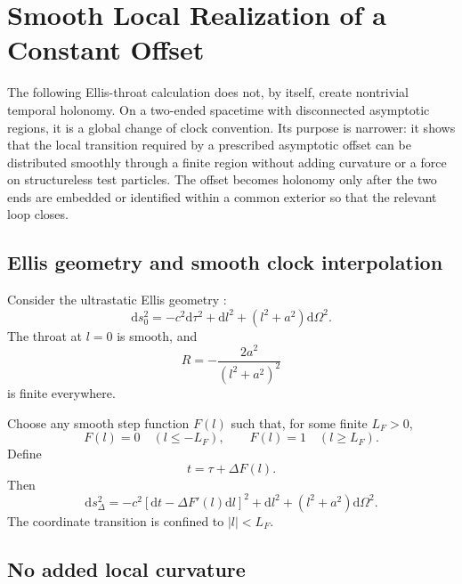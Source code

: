 \documentclass[journal,a4paper]{IEEEtran}
\begin{document}
\section{Smooth Local Realization of a Constant Offset}
\label{sec:smooth_realization}

The following Ellis-throat calculation does not, by itself, create nontrivial temporal holonomy. On a two-ended spacetime with disconnected asymptotic regions, it is a global change of clock convention. Its purpose is narrower: it shows that the local transition required by a prescribed asymptotic offset can be distributed smoothly through a finite region without adding curvature or a force on structureless test particles. The offset becomes holonomy only after the two ends are embedded or identified within a common exterior so that the relevant loop closes.

\subsection{Ellis geometry and smooth clock interpolation}

Consider the ultrastatic Ellis geometry \cite{Ellis1973,Bronnikov1973}:
\begin{equation}
    \boxed{
    \mathrm{d}s_0^2
    =-c^2\mathrm{d}\tau^2
    +\mathrm{d}l^2
    +(l^2+a^2)\mathrm{d}\Omega^2.
    }
    \label{eq:ellis_metric}
\end{equation}
The throat at \(l=0\) is smooth, and
\begin{equation}
    R=-\frac{2a^2}{(l^2+a^2)^2}
\end{equation}
is finite everywhere.

Choose any smooth step function \(F(l)\) such that, for some finite \(L_F>0\),
\begin{equation}
    F(l)=0\quad(l\leq-L_F),
    \qquad
    F(l)=1\quad(l\geq L_F).
    \label{eq:compact_step}
\end{equation}
Define
\begin{equation}
    t=\tau+\Delta F(l).
\end{equation}
Then
\begin{equation}
    \boxed{
    \mathrm{d}s_\Delta^2
    =-c^2[\mathrm{d}t-\Delta F'(l)\mathrm{d}l]^2
    +\mathrm{d}l^2
    +(l^2+a^2)\mathrm{d}\Omega^2.
    }
    \label{eq:smooth_slip_metric}
\end{equation}
The coordinate transition is confined to \(|l|<L_F\).

\subsection{No added local curvature}
\end{document}
